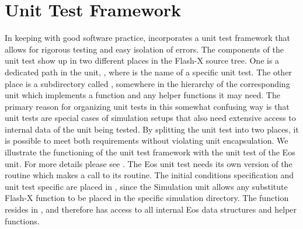 \section{Unit Test Framework}
\label{Sec: unitTest }
In keeping with good software practice, \flashx incorporates a unit
test framework that allows for rigorous testing and easy isolation of
errors. The components of the unit test show up in two different
places in the Flash-X source tree. One is a dedicated path in the
 unit,
, where 
 is the name of a specific unit test. The other place is a
subdirectory called , somewhere in the hierarchy of the
corresponding unit which implements a function 
and any helper functions it may need. The primary reason for organizing unit
tests in this somewhat confusing way is that unit tests are special cases of 
simulation setups that also need extensive access to internal data of the unit
being tested. By splitting the unit
test into two places, it is possible to meet both requirements without
violating unit encapsulation. We illustrate the functioning of the
unit test framework with the unit test of the \unit{Eos} unit. For more
details please see . The \unit{Eos} unit test needs its
own version of the routine  which makes a
call to its  routine. The initial conditions
specification and unit test specific  are
placed in , since
the \unit{Simulation} unit allows any substitute Flash-X function to be placed in
the specific simulation directory. The function 
resides in , and therefore has access to all
internal \unit{Eos} data structures and helper functions.

